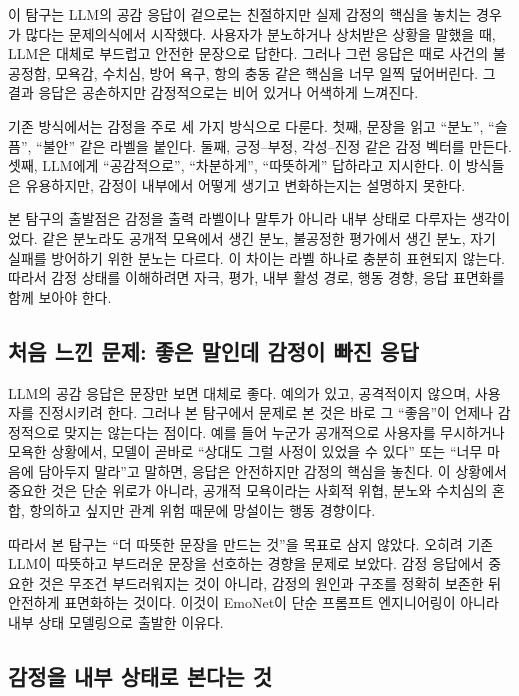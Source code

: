 \documentclass[11pt,a4paper]{article}
\begin{document}
이 탐구는 LLM의 공감 응답이 겉으로는 친절하지만 실제 감정의 핵심을 놓치는 경우가 많다는 문제의식에서 시작했다. 사용자가 분노하거나 상처받은 상황을 말했을 때, LLM은 대체로 부드럽고 안전한 문장으로 답한다. 그러나 그런 응답은 때로 사건의 불공정함, 모욕감, 수치심, 방어 욕구, 항의 충동 같은 핵심을 너무 일찍 덮어버린다. 그 결과 응답은 공손하지만 감정적으로는 비어 있거나 어색하게 느껴진다.

기존 방식에서는 감정을 주로 세 가지 방식으로 다룬다. 첫째, 문장을 읽고 ``분노'', ``슬픔'', ``불안'' 같은 라벨을 붙인다. 둘째, 긍정--부정, 각성--진정 같은 감정 벡터를 만든다. 셋째, LLM에게 ``공감적으로'', ``차분하게'', ``따뜻하게'' 답하라고 지시한다. 이 방식들은 유용하지만, 감정이 내부에서 어떻게 생기고 변화하는지는 설명하지 못한다.

본 탐구의 출발점은 감정을 출력 라벨이나 말투가 아니라 내부 상태로 다루자는 생각이었다. 같은 분노라도 공개적 모욕에서 생긴 분노, 불공정한 평가에서 생긴 분노, 자기 실패를 방어하기 위한 분노는 다르다. 이 차이는 라벨 하나로 충분히 표현되지 않는다. 따라서 감정 상태를 이해하려면 자극, 평가, 내부 활성 경로, 행동 경향, 응답 표면화를 함께 보아야 한다.

\subsection{처음 느낀 문제: 좋은 말인데 감정이 빠진 응답}

LLM의 공감 응답은 문장만 보면 대체로 좋다. 예의가 있고, 공격적이지 않으며, 사용자를 진정시키려 한다. 그러나 본 탐구에서 문제로 본 것은 바로 그 ``좋음''이 언제나 감정적으로 맞지는 않는다는 점이다. 예를 들어 누군가 공개적으로 사용자를 무시하거나 모욕한 상황에서, 모델이 곧바로 ``상대도 그럴 사정이 있었을 수 있다'' 또는 ``너무 마음에 담아두지 말라''고 말하면, 응답은 안전하지만 감정의 핵심을 놓친다. 이 상황에서 중요한 것은 단순 위로가 아니라, 공개적 모욕이라는 사회적 위협, 분노와 수치심의 혼합, 항의하고 싶지만 관계 위험 때문에 망설이는 행동 경향이다.

따라서 본 탐구는 ``더 따뜻한 문장을 만드는 것''을 목표로 삼지 않았다. 오히려 기존 LLM이 따뜻하고 부드러운 문장을 선호하는 경향을 문제로 보았다. 감정 응답에서 중요한 것은 무조건 부드러워지는 것이 아니라, 감정의 원인과 구조를 정확히 보존한 뒤 안전하게 표면화하는 것이다. 이것이 EmoNet이 단순 프롬프트 엔지니어링이 아니라 내부 상태 모델링으로 출발한 이유다.

\subsection{감정을 내부 상태로 본다는 것}
\end{document}
